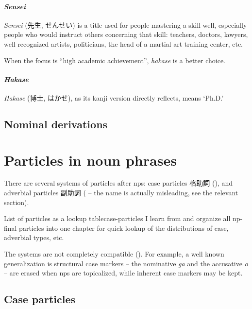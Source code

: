 \documentclass[UTF8, a4paper, oneside, scheme=plain]{ctexrep}
\newcommand{\corpus}[1]{\emph{#1}}
\newcommand{\translate}[1]{`#1'}
\begin{document}
\subsubsection{\corpus{Sensei}}

\corpus{Sensei} (先生, せんせい) is a title used for people mastering a skill well, 
especially people who would instruct others concerning that skill:
teachers, doctors, lawyers, well recognized artists, politicians,
the head of a martial art training center, etc.

When the focus is ``high academic achievement'', \corpus{hakase} is a better choice.

\subsubsection{\corpus{Hakase}}

\corpus{Hakase} (博士, はかせ), as its kanji version directly reflects, means \translate{Ph.D.}


\section{Nominal derivations}

\chapter{Particles in noun phrases}\label{chap:particle-in-np}

There are several systems of particles after \ac{np}s:
case particles 格助詞 (),
and adverbial particles 副助詞 ( 
-- the name is actually misleading, see the relevant section).

\begin{theorybox}{List of particles as a lookup table}{case-particles}
    I learn from \citet{jacques2021grammar} and organize all \ac{np}-final particles into one chapter 
    for quick lookup of the distributions of case, adverbial types, etc.
\end{theorybox}

The systems are not completely compatible ().
For example, a well known generalization is structural case markers 
-- the nominative \corpus{ga} and the accusative \corpus{o} -- 
are erased when \ac{np}s are topicalized,
while inherent case markers may be kept.

\section{Case particles}\label{sec:case-particle}
\end{document}
